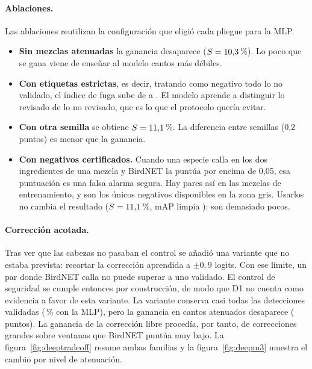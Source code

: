 \begin{table}[H]
  \centering\small
  \caption{Configuración que eligió cada pliegue con su pliegue interno y deriva relativa media de los pesos convolucionales respecto de BirdNET.
  En las cabezas, d$N$ indica un decaimiento $N$ de la capa de salida (cuanto mayor, más cerca de BirdNET) y el signo + un peso mayor de la destilación.
  En las capas convolucionales la rejilla va de \emph{muy prudente} a \emph{libre}. $^{*}$: ninguna configuración cumplía el control en el pliegue
  interno y se tomó la de mayor mAP limpia.}\label{tab:deepgrid}
\end{table}

\paragraph{Ablaciones.}
Las ablaciones reutilizan la configuración que eligió cada pliegue para la MLP.
\begin{itemize}
  \item \textbf{Sin mezclas atenuadas} la ganancia desaparece ($S = 10{,}3$\,\%). Lo poco que se gana viene de enseñar al modelo cantos más débiles.
  \item \textbf{Con etiquetas estrictas}, es decir, tratando como negativo todo lo no validado, el índice de fuga sube de \deepSliMlp{} a \deepSliMlpStrict.
        El modelo aprende a distinguir lo revisado de lo no revisado, que es lo que el protocolo quería evitar.
  \item \textbf{Con otra semilla} se obtiene $S = 11{,}1$\,\%. La diferencia entre semillas (0,2 puntos) es menor que la ganancia.
  \item \textbf{Con negativos certificados.} Cuando una especie calla en los dos ingredientes de una mezcla y BirdNET la puntúa por encima de 0,05,
        esa puntuación es una falsa alarma segura. Hay \deepMixNegatives{} pares así en las mezclas de entrenamiento, y son los únicos negativos disponibles
        en la zona gris. Usarlos no cambia el resultado ($S = 11{,}1$\,\%, mAP limpia \deepCleanMlpNeg): son demasiado pocos.
\end{itemize}

\paragraph{Corrección acotada.}
Tras ver que las cabezas no pasaban el control se añadió una variante que no estaba prevista: recortar la corrección aprendida a $\pm 0{,}9$ logits.
Con ese límite, un par donde BirdNET calla no puede superar a uno validado. El control de seguridad se cumple entonces por construcción, de modo que
D1 no cuenta como evidencia a favor de esta variante. La variante conserva casi todas las detecciones validadas (\deepAttMlpBZero\,\% con la MLP), pero la
ganancia en cantos atenuados desaparece (\deepAttDeltaMlpB{} puntos). La ganancia de la corrección libre procedía, por tanto, de correcciones grandes
sobre ventanas que BirdNET puntúa muy bajo. La figura~\ref{fig:deeptradeoff} resume ambas familias y la figura~\ref{fig:deepm3} muestra el cambio por
nivel de atenuación.

